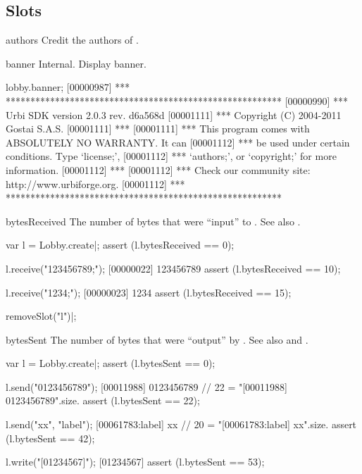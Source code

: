 \subsection{Slots}
\begin{urbiscriptapi}
\item[authors] Credit the authors of \usdk.

\item[banner] Internal.  Display \usdk banner.
\begin{urbiscript}
lobby.banner;
[00000987] *** ********************************************************
[00000990] *** Urbi SDK version 2.0.3 rev. d6a568d
[00001111] *** Copyright (C) 2004-2011 Gostai S.A.S.
[00001111] ***
[00001111] *** This program comes with ABSOLUTELY NO WARRANTY.  It can
[00001112] *** be used under certain conditions.  Type `license;',
[00001112] *** `authors;', or `copyright;' for more information.
[00001112] ***
[00001112] *** Check our community site: http://www.urbiforge.org.
[00001112] *** ********************************************************
\end{urbiscript}

\item[bytesReceived] The number of bytes that were ``input'' to \this.  See
  also .
\begin{urbiscript}
var l = Lobby.create|;
assert (l.bytesReceived == 0);

l.receive("123456789;");
[00000022] 123456789
assert (l.bytesReceived == 10);

l.receive("1234;");
[00000023] 1234
assert (l.bytesReceived == 15);
\end{urbiscript}

\begin{urbicomment}
removeSlot("l")|;
\end{urbicomment}

\item[bytesSent] The number of bytes that were ``output'' by \this.  See
  also  and .
\begin{urbiscript}
var l = Lobby.create|;
assert (l.bytesSent == 0);

l.send("0123456789");
[00011988] 0123456789
// 22 = "[00011988] 0123456789\n".size.
assert (l.bytesSent == 22);

l.send("xx", "label");
[00061783:label] xx
// 20 = "[00061783:label] xx\n".size.
assert (l.bytesSent == 42);

l.write("[01234567]\n");
[01234567]
assert (l.bytesSent == 53);
\end{urbiscript}


\end{urbiscriptapi}
